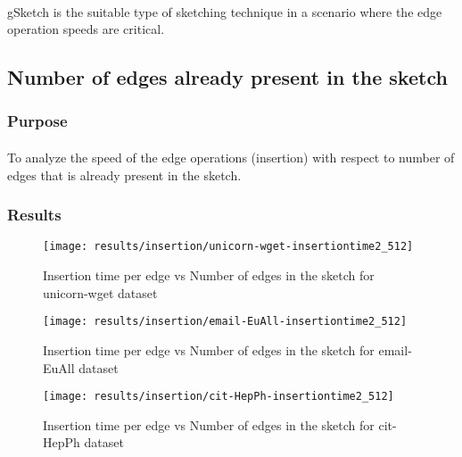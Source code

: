 \paragraph{}
gSketch is the suitable type of sketching technique in a scenario where the edge operation speeds are critical.

\subsection*{Number of edges already present in the sketch}

\subsubsection{Purpose}

\paragraph{}
To analyze the speed of the edge operations (insertion) with respect to number of edges that is already present in the sketch.

\subsubsection{Results}

\begin{figure}[H]
    \centering \texttt{[image: results/insertion/unicorn-wget-insertiontime2\_512]}
    \vspace{-0.5cm}
    \caption{Insertion time per edge vs Number of edges in the sketch for unicorn-wget dataset}
    \label{fig:unicorn-wget-insertiontime2_512}
\end{figure}

\begin{figure}[H]
    \centering \texttt{[image: results/insertion/email-EuAll-insertiontime2\_512]}
    \vspace{-0.5cm}
    \caption{Insertion time per edge vs Number of edges in the sketch for email-EuAll dataset}
    \label{fig:email-EuAll-insertiontime2_512}
\end{figure}

\begin{figure}[H]
    \centering \texttt{[image: results/insertion/cit-HepPh-insertiontime2\_512]}
    \vspace{-0.5cm}
    \caption{Insertion time per edge vs Number of edges in the sketch for cit-HepPh dataset}
    \label{fig:cit-HepPh-insertiontime2_512}
\end{figure}

